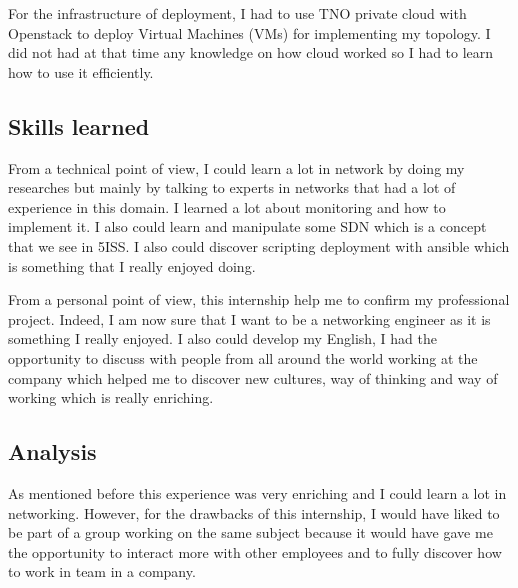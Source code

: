 For the infrastructure of deployment, I had to use TNO private cloud with Openstack to deploy
Virtual Machines (VMs) for implementing my topology. I did not had at that time any knowledge
on how cloud worked so I had to learn how to use it efficiently.

\subsection{Skills learned}

From a technical point of view, I could learn a lot in network by doing my researches but mainly
by talking to experts in networks that had a lot of experience in this domain. I learned a lot about
monitoring and how to implement it. I also could learn and manipulate some SDN which is a concept
that we see in 5ISS. I also could discover scripting deployment with ansible which is something that
I really enjoyed doing.
\smallskip

From a personal point of view, this internship help me to confirm my professional project.
Indeed, I am now sure that I want to be a networking engineer as it is something I really enjoyed.
I also could develop my English, I had the opportunity to discuss with people from all around the
world working at the company which helped me to discover new cultures, way of thinking and way
of working which is really enriching.


\subsection{Analysis}

As mentioned before this experience was very enriching and I could learn a lot in networking.
However, for the drawbacks of this internship, I would have liked to be part of a group working
on the same subject because it would have gave me the opportunity to interact more with other
employees and to fully discover how to work in team in a company.